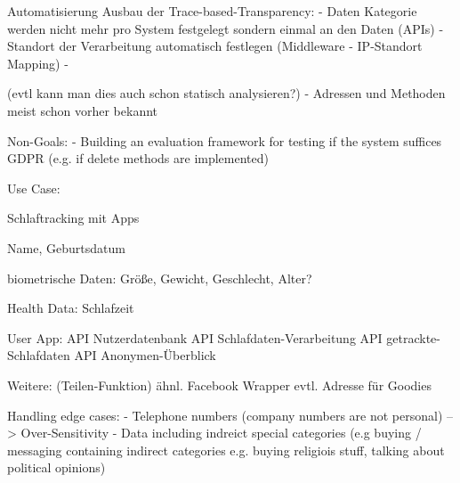 Automatisierung
Ausbau der Trace-based-Transparency: 
 - Daten Kategorie werden nicht mehr pro System festgelegt sondern einmal an den Daten (APIs) 
 - Standort der Verarbeitung automatisch festlegen (Middleware - IP-Standort Mapping)
 - 
 
 
 
 
(evtl kann man dies auch schon statisch analysieren?) 
   - Adressen und Methoden meist schon vorher bekannt
   
   
Non-Goals: 
 - Building an evaluation framework for testing if the system suffices GDPR (e.g. if delete methods are implemented) 
 
 
 Use Case: 
 
 Schlaftracking mit Apps 
 
 Name, 
 Geburtsdatum 
 
 biometrische Daten: 
 Größe,
 Gewicht,
 Geschlecht,
 Alter?
 
 Health Data: 
 Schlafzeit
 
 
 User App: 
 API
 Nutzerdatenbank
 API
 Schlafdaten-Verarbeitung 
 API
 getrackte-Schlafdaten
 API
 Anonymen-Überblick 
 
 Weitere: 
 (Teilen-Funktion) ähnl. Facebook Wrapper
  evtl. Adresse für Goodies 
 
 
 
 






% 





Handling edge cases: 
  - Telephone numbers (company numbers are not personal) --> Over-Sensitivity 
  - Data including indreict special categories (e.g buying / messaging containing indirect categories e.g. buying religiois stuff, talking about political opinions) 

